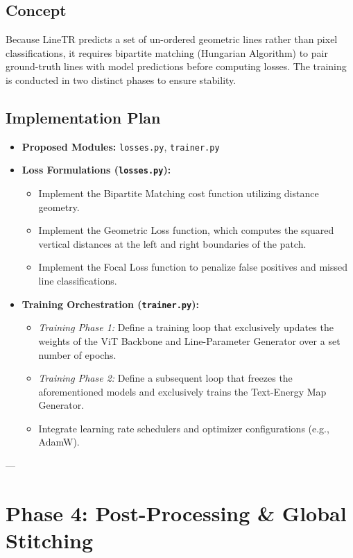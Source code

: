\documentclass[12pt,a4paper]{article}
\begin{document}
\subsection{Concept}
Because LineTR predicts a set of un-ordered geometric lines rather than pixel classifications, it requires bipartite matching (Hungarian Algorithm) to pair ground-truth lines with model predictions before computing losses. The training is conducted in two distinct phases to ensure stability.

\subsection{Implementation Plan}
\begin{itemize}
    \item \textbf{Proposed Modules:} \texttt{losses.py}, \texttt{trainer.py}
    \item \textbf{Loss Formulations (\texttt{losses.py}):}
    \begin{itemize}
        \item Implement the Bipartite Matching cost function utilizing distance geometry.
        \item Implement the Geometric Loss function, which computes the squared vertical distances at the left and right boundaries of the patch.
        \item Implement the Focal Loss function to penalize false positives and missed line classifications.
    \end{itemize}
    \item \textbf{Training Orchestration (\texttt{trainer.py}):}
    \begin{itemize}
        \item \textit{Training Phase 1:} Define a training loop that exclusively updates the weights of the ViT Backbone and Line-Parameter Generator over a set number of epochs.
        \item \textit{Training Phase 2:} Define a subsequent loop that freezes the aforementioned models and exclusively trains the Text-Energy Map Generator.
        \item Integrate learning rate schedulers and optimizer configurations (e.g., AdamW).
    \end{itemize}
\end{itemize}

---

\section{Phase 4: Post-Processing \& Global Stitching}
\end{document}
